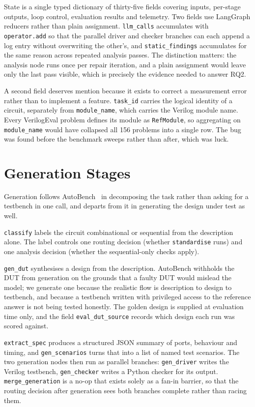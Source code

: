 \documentclass[11pt,a4paper,titlepage=false]{scrreprt}
\begin{document}
State is a single typed dictionary of thirty-five fields covering inputs, per-stage
outputs, loop control, evaluation results and telemetry. Two fields use LangGraph reducers
rather than plain assignment. \texttt{llm\_calls} accumulates with \texttt{operator.add} so
that the parallel driver and checker branches can each append a log entry without
overwriting the other's, and \texttt{static\_findings} accumulates for the same reason
across repeated analysis passes. The distinction matters: the analysis node runs once per
repair iteration, and a plain assignment would leave only the last pass visible, which is
precisely the evidence needed to answer RQ2.

A second field deserves mention because it exists to correct a measurement error rather
than to implement a feature. \texttt{task\_id} carries the logical identity of a circuit,
separately from \texttt{module\_name}, which carries the Verilog module name. Every
VerilogEval problem defines its module as \texttt{RefModule}, so aggregating on
\texttt{module\_name} would have collapsed all 156 problems into a single row. The bug was
found before the benchmark sweeps rather than after, which was luck.

\section{Generation Stages}\label{sec:design-generation}

Generation follows AutoBench~\cite{qiu2024autobench} in decomposing the task rather than
asking for a testbench in one call, and departs from it in generating the design under test
as well.

\texttt{classify} labels the circuit combinational or sequential from the description
alone. The label controls one routing decision (whether \texttt{standardise} runs) and one
analysis decision (whether the sequential-only checks apply).

\texttt{gen\_dut} synthesises a design from the description. AutoBench withholds the DUT
from generation on the grounds that a faulty DUT would mislead the model; we generate one
because the realistic flow is description to design to testbench, and because a testbench
written with privileged access to the reference answer is not being tested honestly. The
golden design is supplied at evaluation time only, and the field \texttt{eval\_dut\_source}
records which design each run was scored against.

\texttt{extract\_spec} produces a structured JSON summary of ports, behaviour and timing,
and \texttt{gen\_scenarios} turns that into a list of named test scenarios. The two
generation nodes then run as parallel branches: \texttt{gen\_driver} writes the Verilog
testbench, \texttt{gen\_checker} writes a Python checker for its output.
\texttt{merge\_generation} is a no-op that exists solely as a fan-in barrier, so that the
routing decision after generation sees both branches complete rather than racing them.
\end{document}
